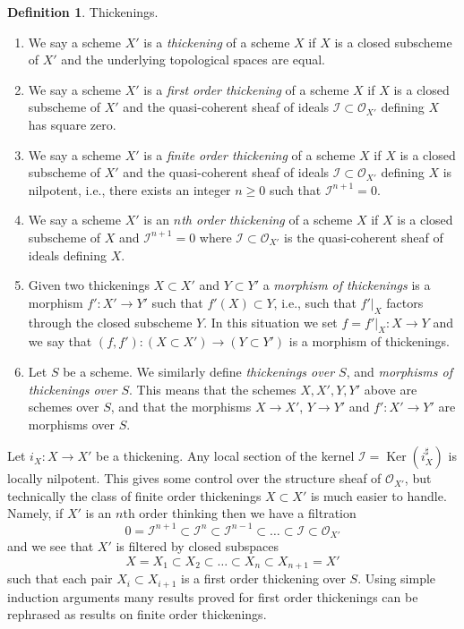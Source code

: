 \documentclass[10pt,a4paper]{amsart}
\theoremstyle{plain}
\theoremstyle{definition}
\newtheorem{definition}[subsection]{Definition}
\theoremstyle{remark}
\numberwithin{equation}{subsection}
\def\Ker{\mathop{\mathrm{Ker}}}
\begin{document}
\begin{definition}
\label{definition-thickening}
Thickenings.
\begin{enumerate}
\item We say a scheme $X'$ is a {\it thickening} of a scheme $X$ if
$X$ is a closed subscheme of $X'$ and the underlying topological spaces
are equal.
\item We say a scheme $X'$ is a {\it first order thickening} of a scheme $X$ if
$X$ is a closed subscheme of $X'$ and the quasi-coherent sheaf of ideals
$\mathcal{I} \subset \mathcal{O}_{X'}$ defining $X$ has square zero.
\item We say a scheme $X'$ is a {\it finite order thickening} of a scheme $X$
if $X$ is a closed subscheme of $X'$ and the quasi-coherent sheaf of ideals
$\mathcal{I} \subset \mathcal{O}_{X'}$ defining $X$ is nilpotent, i.e.,
there exists an integer $n \geq 0$ such that $\mathcal{I}^{n + 1} = 0$.
\item We say a scheme $X'$ is an {\it $n$th order thickening} of a scheme $X$
if $X$ is a closed subscheme of $X$ and $\mathcal{I}^{n + 1} = 0$
where $\mathcal{I} \subset \mathcal{O}_{X'}$ is the
quasi-coherent sheaf of ideals defining $X$.
\item Given two thickenings $X \subset X'$ and $Y \subset Y'$ a
{\it morphism of thickenings} is a morphism $f' : X' \to Y'$ such that
$f'(X) \subset Y$, i.e., such that $f'|_X$ factors through the closed
subscheme $Y$. In this situation we set $f = f'|_X : X \to Y$ and we say
that $(f, f') : (X \subset X') \to (Y \subset Y')$ is a morphism of
thickenings.
\item Let $S$ be a scheme. We similarly define {\it thickenings over $S$}, and
{\it morphisms of thickenings over $S$}. This means that the schemes
$X, X', Y, Y'$ above are schemes over $S$, and that the morphisms
$X \to X'$, $Y \to Y'$ and $f' : X' \to Y'$ are morphisms over $S$.
\end{enumerate}
\end{definition}

\noindent
Let $i_X : X \to X'$ be a thickening. Any local section of the kernel
$\mathcal{I} = \Ker(i_X^\sharp)$ is locally nilpotent. This gives
some control over the structure sheaf of $\mathcal{O}_{X'}$, but
technically the class of finite order thickenings $X \subset X'$
is much easier to handle. Namely, if $X'$ is an $n$th order thinking
then we have a filtration
$$
0 = \mathcal{I}^{n + 1} \subset
\mathcal{I}^n \subset
\mathcal{I}^{n - 1} \subset \ldots \subset
\mathcal{I} \subset \mathcal{O}_{X'}
$$
and we see that $X'$ is filtered by closed subspaces
$$
X = X_1 \subset X_2 \subset \ldots \subset X_n \subset X_{n + 1} = X'
$$
such that each pair $X_i \subset X_{i + 1}$ is a first order thickening
over $S$. Using simple induction arguments many results proved for first order
thickenings can be rephrased as results on finite order thickenings.
\end{document}
